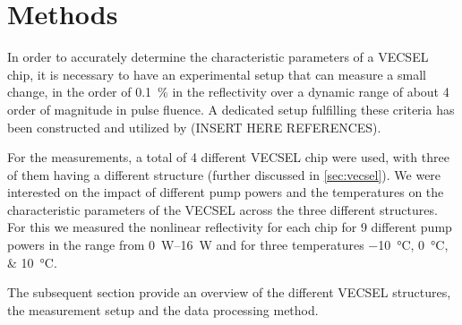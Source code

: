 \chapter{Methods}\label{chapter:methods}
In order to accurately determine the characteristic parameters of a VECSEL chip, it is necessary to have an experimental setup that can measure a small change, in the order of \qty{0.1}{\percent} in the reflectivity over a dynamic range of about 4 order of magnitude in pulse fluence. A dedicated setup fulfilling these criteria has been constructed and utilized by  (INSERT HERE REFERENCES).

For the measurements, a total of 4 different VECSEL chip were used, with three of them having a different structure (further discussed in \cref{sec:vecsel}). We were interested on the impact of different pump powers and the temperatures on the characteristic parameters of the VECSEL across the three different structures. For this we measured the nonlinear reflectivity for each chip for 9 different pump powers in the range from \qtyrange{0}{16}{\watt} and for three temperatures \qtylist{-10;0;10}{\degreeCelsius}.

The subsequent section provide an overview of the different VECSEL structures, the measurement setup and the data processing method.








